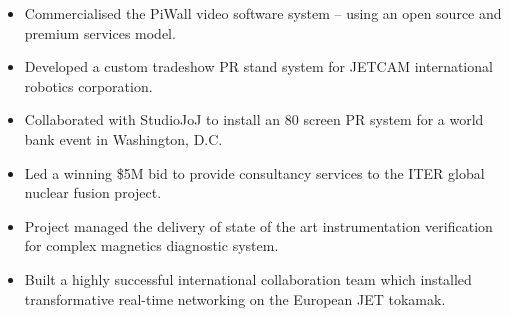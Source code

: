 \documentclass[10pt,a4paper,ragged2e]{altacv}
\begin{document}
		
		\begin{fullwidth}
			\makecvheader
		\end{fullwidth}
		
		
		
		\begin{itemize}
			\item Commercialised the PiWall video software system -- using an open source and premium services model.
			\item Developed a custom tradeshow PR stand system for JETCAM international robotics corporation.
			\item Collaborated with StudioJoJ to install an 80 screen PR system for a world bank event in Washington, D.C.
		\end{itemize}
		
		\divider
		
		\begin{itemize}
			\item Led a winning \$5M bid to provide consultancy services to the ITER global nuclear fusion project.
			\item Project managed the delivery of state of the art instrumentation verification for complex magnetics diagnostic system.
			\item Built a highly successful international collaboration team which installed transformative real-time networking on the European JET tokamak.
		\end{itemize}
		
\end{document}
